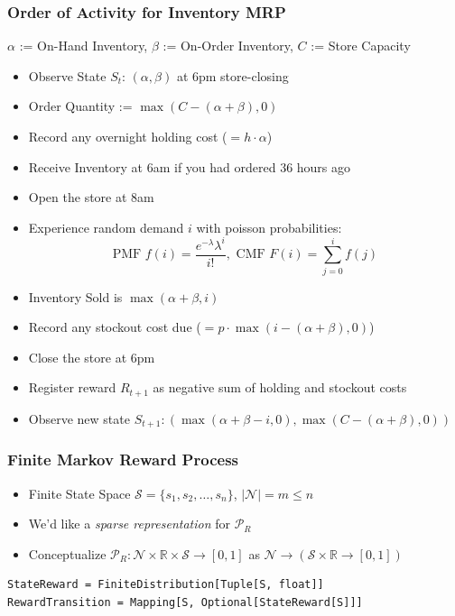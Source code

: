 \documentclass[handout]{beamer}
\begin{document}
\begin{frame}
\frametitle{Order of Activity for Inventory MRP}
\pause
$\alpha$ := On-Hand Inventory, $\beta$ := On-Order Inventory, $C$ := Store Capacity
\pause
\begin{itemize}[<+->]
\item Observe State $S_t$: $(\alpha, \beta)$ at 6pm store-closing
\item Order Quantity := $\max(C - (\alpha + \beta), 0)$
\item Record any overnight holding cost ($=h \cdot \alpha$)
\item Receive Inventory at 6am if you had ordered 36 hours ago
\item Open the store at 8am
\item Experience random demand $i$ with poisson probabilities:
$$\text{PMF } f(i) = \frac {e^{-\lambda} \lambda^i} {i!}, \text{ CMF } F(i) = \sum_{j=0}^i f(j)$$
\item Inventory Sold is $\max(\alpha + \beta, i)$
\item Record any stockout cost due ($=p\cdot \max(i - (\alpha + \beta), 0)$)
\item Close the store at 6pm
\item Register reward $R_{t+1}$ as negative sum of holding and stockout costs
\item Observe new state $S_{t+1}: (\max(\alpha + \beta - i, 0), \max(C - (\alpha + \beta), 0))$
\end{itemize}
\end{frame}

\begin{frame}[fragile]
\frametitle{Finite Markov Reward Process}
\pause
\begin{itemize}[<+->]
\item Finite State Space $\mathcal{S} = \{s_1, s_2, \ldots, s_n\}$, $|\mathcal{N}| = m\leq n$
\item We'd like a {\em sparse representation} for $\mathcal{P}_R$
\item Conceptualize $\mathcal{P}_R : \mathcal{N} \times \mathbb{R} \times \mathcal{S} \rightarrow [0, 1]$ as $\mathcal{N} \rightarrow (\mathcal{S} \times \mathbb{R} \rightarrow [0, 1])$
\end{itemize}
\begin{lstlisting}
StateReward = FiniteDistribution[Tuple[S, float]]
RewardTransition = Mapping[S, Optional[StateReward[S]]]
\end{lstlisting}
\end{frame}
\end{document}
